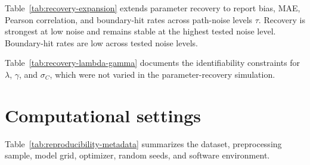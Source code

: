 \documentclass[11pt,final]{article}
\begin{document}
Table~\ref{tab:recovery-expansion} extends parameter recovery to report bias, MAE, Pearson correlation, and boundary-hit rates across path-noise levels $\tau$. Recovery is strongest at low noise and remains stable at the highest tested noise level. Boundary-hit rates are low across tested noise levels.



Table~\ref{tab:recovery-lambda-gamma} documents the identifiability constraints for $\lambda$, $\gamma$, and $\sigma_C$, which were not varied in the parameter-recovery simulation.



\section{Computational settings}
\label{sec:supp-reproducibility}

Table~\ref{tab:reproducibility-metadata} summarizes the dataset, preprocessing sample, model grid, optimizer, random seeds, and software environment.


\end{document}
